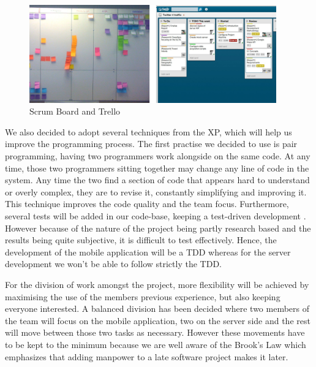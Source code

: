 \begin{figure}[here]
\begin{minipage}{\textwidth}
\begin{center}
\includegraphics[width=0.95\textwidth]{images/scrumboard.jpg}
\end{center}
\vspace{-20pt}
\caption[Caption for LOF]{Scrum Board and Trello\footnotemark}
\end{minipage} 
\end{figure}


We also decided to adopt several techniques from the XP, which will help us improve the programming process. The first practise we decided to use is pair programming, having two programmers work alongside on the same code. At any time, those two programmers sitting together may change any line of code in the system. Any time the two find a section of code that appears hard to understand or overly complex, they are to revise it, constantly simplifying and improving it. This technique improves the code quality and the team focus. Furthermore, several tests will be added in our code-base, keeping a test-driven development . However because of the nature of the project being partly research based and the results being quite subjective, it is difficult to test effectively. Hence, the development of the mobile application will be a TDD whereas for the server development we won't be able to follow strictly the TDD.\cite{Cockburn}

For the division of work amongst the project, more flexibility will be achieved by maximising the use of the members previous experience, but also keeping everyone interested. A balanced division has been decided where two members of the team will focus on the mobile application, two on the server side and the rest will move between those two tasks as necessary. However these movements have to be kept to the minimum because we are well aware of the Brook's Law which emphasizes that adding manpower to a late software project makes it later.\cite{Brooks}

